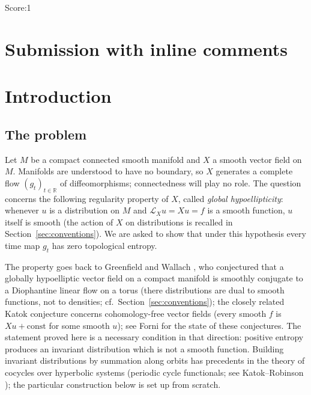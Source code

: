\documentclass[11pt]{article}
\theoremstyle{remark}
\newcommand{\R}{\mathbb R}
\newcommand{\LX}{\mathcal L_X}
\begin{document}
\noindent Score:1
\newpage
\section{Submission with inline comments}


\section{Introduction}
\label{sec:intro}

\subsection{The problem}

Let \(M\) be a compact connected smooth manifold and \(X\) a smooth
vector field on \(M\).  Manifolds are understood to have no
boundary, so \(X\) generates a complete flow \((g_t)_{t\in\R}\) of
diffeomorphisms; connectedness will play no role.  The question concerns the following regularity
property of \(X\), called \emph{global hypoellipticity}: whenever
\(u\) is a distribution on \(M\) and \(\LX u=Xu=f\) is a smooth
function, \(u\) itself is smooth (the action of \(X\) on
distributions is recalled in Section~\ref{sec:conventions}).  We are
asked to show that under this hypothesis every time map \(g_t\) has
zero topological entropy.

The property goes back to Greenfield and Wallach
\cite{GreenfieldWallach1973}, who conjectured that a globally
hypoelliptic vector field on a compact manifold is smoothly conjugate
to a Diophantine linear flow on a torus (there distributions are
dual to smooth functions, not to densities; cf.\
Section~\ref{sec:conventions}); the closely related Katok
conjecture concerns cohomology-free vector fields (every smooth
\(f\) is \(Xu+\mathrm{const}\) for some smooth \(u\)); see Forni
\cite{Forni2008} for the state of these conjectures.
The statement proved here is a necessary condition in that direction:
positive entropy produces an invariant distribution which is not a
smooth function.
Building invariant distributions by summation along orbits has
precedents in the theory of cocycles over hyperbolic systems
(periodic cycle functionals; see Katok--Robinson
\cite{KatokRobinson2001}); the particular construction below is set
up from scratch.
\end{document}
